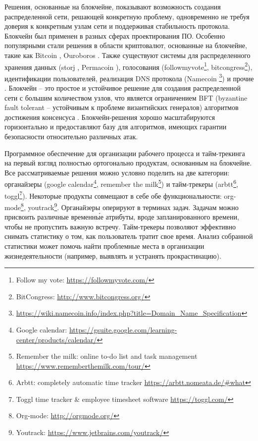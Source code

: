 \documentclass[specification,annotation]{itmo-student-thesis}
\begin{document}
\tableofcontents

\startprefacepage

Решения, основанные на блокчейне, показывают возможность создания
распределенной сети, решающей конкретную проблему, одновременно не
требуя доверия к конкретным узлам сети и поддерживая стабильность
протокола. Блокчейн был применен в разных сферах проектирования
ПО. Особенно популярными стали решения в области криптовалют,
основанные на блокчейне, такие как Bitcoin \cite{bitcoin}, Ouroboros
\cite{ouroboros}. Также существуют системы для распределенного
хранения данных (storj \cite{wilkinson2014storj}, Permacoin
\cite{permacoin}), голосования (followmyvote\footnote{Follow my vote:
  \url{https://followmyvote.com/}}, bitcongress\footnote{BitCongress:
  \url{http://www.bitcongress.org/}}), идентификации пользователей,
реализация DNS протокола
(Namecoin \footnote{\url{https://wiki.namecoin.info/index.php?title=Domain_Name_Specification}})
и прочие \cite{swan2015blockchain}. Блокчейн -- это простое и
устойчивое решение для создания распределенной сети с большим
количеством узлов, что является ограничением BFT (byzantine fault
tolerant -- устойчивым к проблеме византийских генералов) алгоритмов
достижения консенсуса \cite{powbftquest}. Блокчейн-решения хорошо
масштабируются горизонтально и предоставляют базу для алгоритмов,
имеющих гарантии безопасности относительно различных атак.

Программное обеспечение для организации рабочего процесса и
тайм-трекинга на первый взгляд полностью ортогонально продуктам,
основанным на блокчейне. Все рассматриваемые решения можно условно
поделить на две категории: органайзеры (google
calendar\footnote{Google calendar:
  \url{https://gsuite.google.com/learning-center/products/calendar/}},
remember the milk\footnote{Remember the milk: online to-do list and
  task management \url{https://www.rememberthemilk.com/tour/}}) и
тайм-трекеры (arbtt\footnote{Arbtt: completely automatic time tracker
  \url{https://arbtt.nomeata.de/#what}}, toggl\footnote{Toggl time
  tracker \& employee timesheet software
  \url{https://toggl.com/}}). Некоторые продукты совмещают в себе обе
функциональности: org-mode\footnote{Org-mode:
  \url{http://orgmode.org/}}, youtrack\footnote{ Youtrack:
  \url{https://www.jetbrains.com/youtrack/}}. Органайзеры оперируют в
терминах задач. Задачам можно присвоить различные временн\'{ы}е атрибуты,
вроде запланированного времени, чтобы не пропустить важную
встречу. Тайм-трекеры позволяют эффективно снимать статистику о том,
как пользователь тратит свое время. Анализ собранной статистики может
помочь найти проблемные места в организации жизнедеятельности
(например, выявлять и устранять прокрастинацию).
\end{document}
